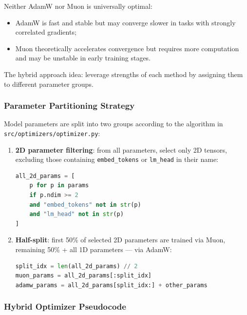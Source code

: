 \documentclass[a4paper,12pt]{article}
\begin{document}
Neither AdamW nor Muon is universally optimal:
\begin{itemize}
    \item AdamW is fast and stable but may converge slower in tasks with strongly correlated gradients;
    \item Muon theoretically accelerates convergence but requires more computation and may be unstable in early training stages.
\end{itemize}

The hybrid approach idea: leverage strengths of each method by assigning them to different parameter groups.

\subsubsection{Parameter Partitioning Strategy}

Model parameters are split into two groups according to the algorithm in \texttt{src/optimizers/optimizer.py}:

\begin{enumerate}
    \item \textbf{2D parameter filtering}: from all parameters, select only 2D tensors, excluding those containing \texttt{embed\_tokens} or \texttt{lm\_head} in their name:
    \begin{lstlisting}[language=Python]
all_2d_params = [
    p for p in params
    if p.ndim >= 2 
    and "embed_tokens" not in str(p) 
    and "lm_head" not in str(p)
]
    \end{lstlisting}
    
    \item \textbf{Half-split}: first 50\% of selected 2D parameters are trained via Muon, remaining 50\% + all 1D parameters --- via AdamW:
    \begin{lstlisting}[language=Python]
split_idx = len(all_2d_params) // 2
muon_params = all_2d_params[:split_idx]
adamw_params = all_2d_params[split_idx:] + other_params
    \end{lstlisting}
\end{enumerate}

\subsubsection{Hybrid Optimizer Pseudocode}
\end{document}
